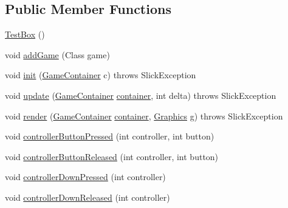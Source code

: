 \subsection*{Public Member Functions}
\begin{DoxyCompactItemize}
\item 
\mbox{\hyperlink{classorg_1_1newdawn_1_1slick_1_1tests_1_1_test_box_a640adeac1eced619cbe249beb5d57058}{Test\+Box}} ()
\item 
void \mbox{\hyperlink{classorg_1_1newdawn_1_1slick_1_1tests_1_1_test_box_a435f291b54dc02ebc668f95f3cfb6b48}{add\+Game}} (Class game)
\item 
void \mbox{\hyperlink{classorg_1_1newdawn_1_1slick_1_1tests_1_1_test_box_ae26aebebd3fdc8fc5c72b1c68bf1ec40}{init}} (\mbox{\hyperlink{classorg_1_1newdawn_1_1slick_1_1_game_container}{Game\+Container}} c)  throws Slick\+Exception 
\item 
void \mbox{\hyperlink{classorg_1_1newdawn_1_1slick_1_1tests_1_1_test_box_a5afb446322779234462583bb574b0e63}{update}} (\mbox{\hyperlink{classorg_1_1newdawn_1_1slick_1_1_game_container}{Game\+Container}} \mbox{\hyperlink{classorg_1_1newdawn_1_1slick_1_1tests_1_1_test_box_a686d64440b8b2323907a6c4641669c60}{container}}, int delta)  throws Slick\+Exception 
\item 
void \mbox{\hyperlink{classorg_1_1newdawn_1_1slick_1_1tests_1_1_test_box_ae3eeba9177511bbd8529c41fd02ffaed}{render}} (\mbox{\hyperlink{classorg_1_1newdawn_1_1slick_1_1_game_container}{Game\+Container}} \mbox{\hyperlink{classorg_1_1newdawn_1_1slick_1_1tests_1_1_test_box_a686d64440b8b2323907a6c4641669c60}{container}}, \mbox{\hyperlink{classorg_1_1newdawn_1_1slick_1_1_graphics}{Graphics}} g)  throws Slick\+Exception 
\item 
void \mbox{\hyperlink{classorg_1_1newdawn_1_1slick_1_1tests_1_1_test_box_a26fb5a8be9ff46cb1a0d0e4bd0cff1f0}{controller\+Button\+Pressed}} (int controller, int button)
\item 
void \mbox{\hyperlink{classorg_1_1newdawn_1_1slick_1_1tests_1_1_test_box_a86db5c38f8964e3e401bc42b60562a42}{controller\+Button\+Released}} (int controller, int button)
\item 
void \mbox{\hyperlink{classorg_1_1newdawn_1_1slick_1_1tests_1_1_test_box_aa84a23e65a7987d83d2b555dce79076d}{controller\+Down\+Pressed}} (int controller)
\item 
void \mbox{\hyperlink{classorg_1_1newdawn_1_1slick_1_1tests_1_1_test_box_af8a047e0bfc8291159b6bdd5b5158dc3}{controller\+Down\+Released}} (int controller)
\item 

\end{DoxyCompactItemize}
